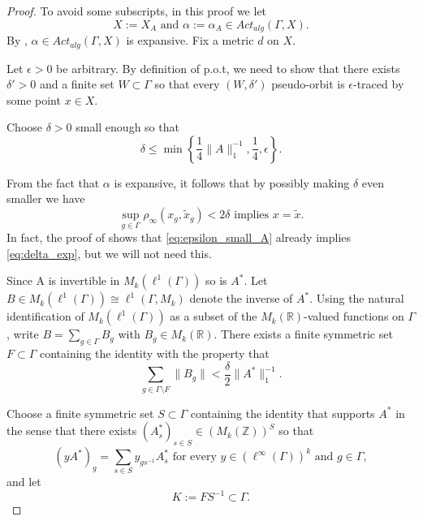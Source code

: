 \documentclass[oneside,english]{amsart}
\theoremstyle{definition}
\newcommand{\dT}{\rho_\infty}
\newcommand{\Alg}[2]{\mathit{Act}_{\mathit{alg}}({#1},{#2})}
\begin{document}
\begin{proof}
To avoid some subscripts, in this  proof we let
\begin{equation}
X:= X_A \mbox{ and }
\alpha:= \alpha_A \in \Alg{\Gamma}{X}.
\end{equation}
By \cite[Lemma $3.7$]{MR3314515}, $\alpha \in  \Alg{\Gamma}{X}$ is expansive.
Fix a metric  $d$ on $X$.

Let   $\epsilon >0$ be arbitrary.
 By definition of p.o.t,
we need to show that there exists  $\delta' >0$ and a finite set $W \subset \Gamma$ so that every $(W,\delta')$ pseudo-orbit is $\epsilon$-traced by some point $x \in X$.


Choose $\delta >0$ small enough so that
\begin{equation}\label{eq:epsilon_small_A}
 \delta \le \min\left\{\frac{1}{4}\|A\|_1^{-1},\frac{1}{4}, \epsilon\right\}.
\end{equation}

From the fact that $\alpha$ is expansive, it follows that by possibly making $\delta$ even smaller we have
\begin{equation}\label{eq:delta_exp}
 \sup_{ g \in \Gamma}\dT( x_{g},\tilde x_{g}) < 2\delta  \mbox{ implies } x=\tilde x.
\end{equation}
In fact, the proof of \cite[Lemma $3.7$]{MR3314515} shows that \eqref{eq:epsilon_small_A} already implies \eqref{eq:delta_exp}, but we will not need this.

Since A is invertible in $M_k(\ell^1(\Gamma))$ so is $A^*$. Let $B \in M_k(\ell^1(\Gamma)) \cong \ell^1(\Gamma, M_k)$ denote the inverse of $A^*$.
Using the natural  identification of $M_k(\ell^1(\Gamma))$ as a subset of the $M_k(\mathbb{R})$-valued functions on $\Gamma$, write $B= \sum_{g \in \Gamma} B_g$ with $B_g \in M_k(\mathbb{R})$. %
There exists a  finite symmetric set  $F\subset \Gamma$  containing the identity with the property that
\begin{equation}\label{eq:F_1_approx}
\sum_{g \in \Gamma \setminus F} \|B_g\| < \frac{\delta}{2}\|A^*\|^{-1}_1.
\end{equation}



Choose a finite symmetric set $S \subset \Gamma$  containing the identity that supports  $A^*$ in the sense that there exists $(A^*_s)_{s \in S} \in (M_k(\mathbb{Z}))^S$ so that
$$(yA^*)_g = \sum_{s \in S}y_{gs^{-1}}A^*_s \mbox{ for every } y \in (\ell^\infty(\Gamma))^k \mbox{ and } g \in  \Gamma,$$
and let
\begin{equation}
K := FS^{-1} \subset \Gamma.
\end{equation}


\end{proof}
\end{document}
